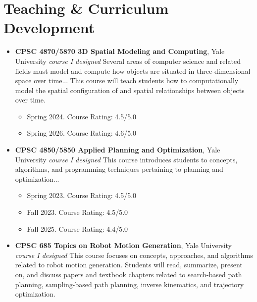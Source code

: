 \documentclass[11pt, letterpaper]{article}
\begin{document}
\section*{Teaching \& Curriculum Development}
\begin{itemize}[leftmargin=0pt, label={}, itemsep=0.5em]
    \item \textbf{CPSC 4870/5870 3D Spatial Modeling and Computing}, Yale University \hfill \textit{course I designed}    \newline Several areas of computer science and related fields must model and compute how objects are situated in three-dimensional space over time... This course will teach students how to computationally model the spatial configuration of and spatial relationships between objects over time.                        \begin{itemize}[leftmargin=1.5em, label={--}, topsep=2pt, partopsep=0pt, itemsep=0pt, parsep=0pt]
                            \item Spring 2024. Course Rating: 4.5/5.0
                            \item Spring 2026. Course Rating: 4.6/5.0
                        \end{itemize}
            \vspace{0.5em}
                \item \textbf{CPSC 4850/5850 Applied Planning and Optimization}, Yale University \hfill \textit{course I designed}    \newline This course introduces students to concepts, algorithms, and programming techniques pertaining to planning and optimization...                        \begin{itemize}[leftmargin=1.5em, label={--}, topsep=2pt, partopsep=0pt, itemsep=0pt, parsep=0pt]
                            \item Spring 2023. Course Rating: 4.5/5.0
                            \item Fall 2023. Course Rating: 4.5/5.0
                            \item Fall 2025. Course Rating: 4.4/5.0
                        \end{itemize}
            \vspace{0.5em}
                \item \textbf{CPSC 685 Topics on Robot Motion Generation}, Yale University \hfill \textit{course I designed}    \newline This course focuses on concepts, approaches, and algorithms related to robot motion generation. Students will read, summarize, present on, and discuss papers and textbook chapters related to search-based path planning, sampling-based path planning, inverse kinematics, and trajectory optimization.                        \begin{itemize}[leftmargin=1.5em, label={--}, topsep=2pt, partopsep=0pt, itemsep=0pt, parsep=0pt]

\end{itemize}
\end{itemize}
\end{document}
